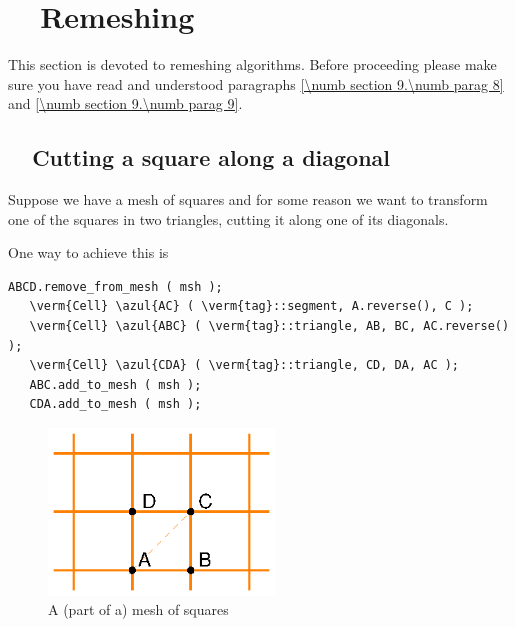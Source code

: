 
\chapter{~~Remeshing}\label{\numb section 10}

This section is devoted to remeshing algorithms.
Before proceeding please make sure you have read and understood paragraphs
\ref{\numb section 9.\numb parag 8} and \ref{\numb section 9.\numb parag 9}.


\section{~~Cutting a square along a diagonal}\label{\numb section 10.\numb parag 1}

Suppose we have a mesh of squares and for some reason we want to transform one of the
squares in two triangles, cutting it along one of its diagonals.

One way to achieve this is

\begin{Verbatim}[commandchars=\\\{\},formatcom=\small\tt,frame=single,
   label=parag-\ref{\numb section 10.\numb parag 1}.cpp,rulecolor=\color{coment},
   baselinestretch=0.94,framesep=2mm]
   ABCD.remove_from_mesh ( msh );
   \verm{Cell} \azul{AC} ( \verm{tag}::segment, A.reverse(), C );
   \verm{Cell} \azul{ABC} ( \verm{tag}::triangle, AB, BC, AC.reverse() );
   \verm{Cell} \azul{CDA} ( \verm{tag}::triangle, CD, DA, AC );
   ABC.add_to_mesh ( msh );
   CDA.add_to_mesh ( msh );
\end{Verbatim}

\begin{figure}[ht] \centering
  \includegraphics[width=60mm]{malha-quadr}
  \caption{A (part of a) mesh of squares}
  \label{\numb section 10.\numb fig 1}
\end{figure}

